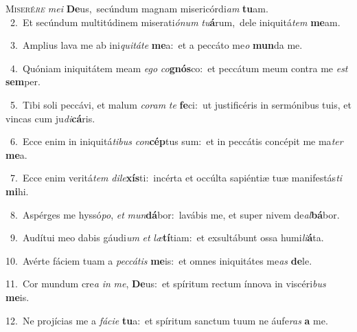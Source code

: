 \lettrine{\initial\textcolor{\initialcolor}{M}}{iseré\-\textit{re}\-} \textit{me}\-\textit{i} \textbf{De}\-us,~\star secúndum magnam misericórdi\textit{am} \textbf{tu}\-am.\\
{\numbfont\textcolor{\numbcolor}{~2.}}~Et secúndum multitúdinem miserati\-\textit{ó}\-\textit{num} \textit{tu}\-\textbf{á}rum,~\star dele iniquitá\textit{tem} \textbf{me}\-am.\par
{\numbfont\textcolor{\numbcolor}{~3.}}~Amplius lava me ab ini\-\textit{qui}\-\textit{tá}\textit{te} \textbf{me}\-a:~\star et a peccáto me\textit{o} \textbf{mun}\-da me.\par
{\numbfont\textcolor{\numbcolor}{~4.}}~Quóniam iniquitátem meam \textit{e}\-\textit{go} \textit{co}\-\textbf{gnós}co:~\star et peccátum meum contra me \textit{est} \textbf{sem}\-per.\par
{\numbfont\textcolor{\numbcolor}{~5.}}~Tibi soli peccávi, et malum \textit{co}\-\textit{ram} \textit{te} \textbf{fe}\-ci:~\star ut justificéris in sermónibus tuis, et vincas cum ju\-\textit{di}\-\textbf{cá}ris.\par
{\numbfont\textcolor{\numbcolor}{~6.}}~Ecce enim in iniquitá\-\textit{ti}\-\textit{bus} \textit{con}\-\textbf{cép}tus sum:~\star et in peccátis concépit me ma\textit{ter} \textbf{me}\-a.\par
{\numbfont\textcolor{\numbcolor}{~7.}}~Ecce enim veritá\textit{tem} \textit{di}\-\textit{le}\textbf{xís}ti:~\star incérta et occúlta sapiéntiæ tuæ manifestás\textit{ti} \textbf{mi}\-hi.\par
{\numbfont\textcolor{\numbcolor}{~8.}}~Aspérges me hyssó\-\textit{po}\-, \textit{et} \textit{mun}\-\textbf{dá}bor:~\star lavábis me, et super nivem de\-\textit{al}\-\textbf{bá}bor.\par
{\numbfont\textcolor{\numbcolor}{~9.}}~Audítui meo dabis gáudi\textit{um} \textit{et} \textit{læ}\-\textbf{tí}tiam:~\star et exsultábunt ossa humi\-\textit{li}\-\textbf{á}ta.\par
{\numbfont\textcolor{\numbcolor}{10.}}~Avérte fáciem tuam a \textit{pec}\-\textit{cá}\textit{tis} \textbf{me}\-is:~\star et omnes iniquitátes me\textit{as} \textbf{de}\-le.\par
{\numbfont\textcolor{\numbcolor}{11.}}~Cor mundum cre\textit{a} \textit{in} \textit{me}\-, \textbf{De}\-us:~\star et spíritum rectum ínnova in viscéri\textit{bus} \textbf{me}\-is.\par
{\numbfont\textcolor{\numbcolor}{12.}}~Ne projícias me a \textit{fá}\-\textit{ci}\textit{e} \textbf{tu}\-a:~\star et spíritum sanctum tuum ne áufe\textit{ras} \textbf{a} me.\par
